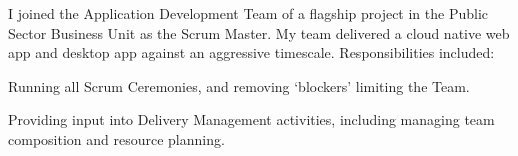 \sectionsep{}
I joined the Application Development Team of a flagship project in the Public Sector Business Unit as the Scrum Master.
My team delivered a cloud native web app and desktop app against an aggressive timescale.
Responsibilities included:
\vspace{0.25em}
\begin{tightemize}
  \item Running all Scrum Ceremonies, and removing `blockers' limiting the Team.
  \item Providing input into Delivery Management activities, including managing team composition and resource planning.
\end{tightemize}
\sectionsep{}
